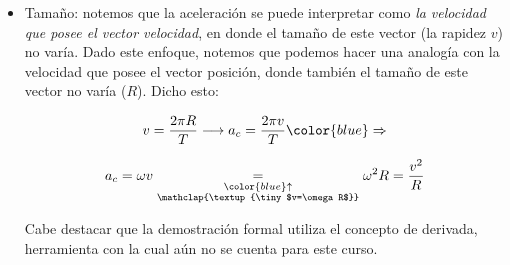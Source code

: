 \documentclass[letterpaper,11pt]{article}
\begin{document}
\begin{itemize}
\begin{itemize}
        \item Tamaño: notemos que la aceleración se puede interpretar como \textit{la velocidad que posee el vector velocidad}, en donde el tamaño de este vector (la rapidez $v$) no varía. Dado este enfoque, notemos que podemos hacer una analogía con la velocidad que posee el vector posición, donde también el tamaño de este vector no varía ($R$). Dicho esto:
        \begin{center}
            \begin{minipage}{0.3\linewidth}
                \vspace{-1.1em}
                \begin{align*}
                    v = \frac{2\pi R}{T} \longrightarrow a_c = \frac{2\pi v}{T} \color{blue}\Rightarrow
                \end{align*}
            \end{minipage}
            \begin{minipage}{0.26\linewidth}
                \begin{tcolorbox}[colback=white, colframe=blue, width=1\linewidth]
                    \vspace{-1.1em}
                    \begin{align*}
                        a_c = \omega v \underset{\substack{\color{blue}\uparrow \\ \mathclap{\textup{\tiny $v=\omega R$}}}} {=} \omega^2 R = \frac{v^2}{R}
                    \end{align*}
                \end{tcolorbox}
            \end{minipage}
        \end{center}
        Cabe destacar que la demostración formal utiliza el concepto de derivada, herramienta con la cual aún no se cuenta para este curso.
    \end{itemize}
\end{itemize}


\end{document}
